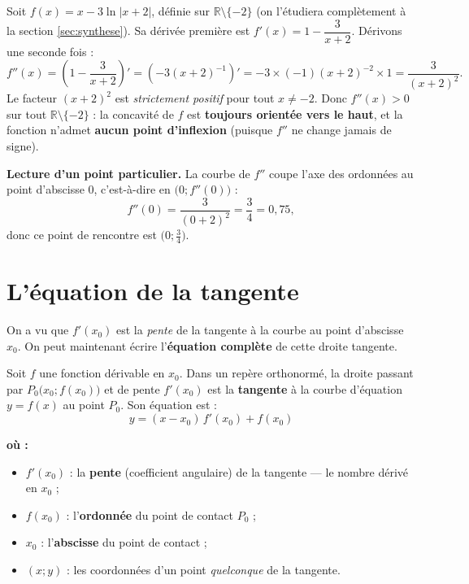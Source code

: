\documentclass[11pt,a4paper]{article}
\newenvironment{ou}{%
  \par\smallskip\noindent\textbf{où :}\nopagebreak
  \begin{itemize}[leftmargin=1.8em,topsep=2pt,itemsep=1.5pt,parsep=0pt]}%
  {\end{itemize}}
\newcommand{\R}{\mathbb{R}}
\begin{document}
\begin{exemple}
Soit $f(x)=x-3\ln|x+2|$, définie sur $\R\setminus\{-2\}$ (on l'étudiera complètement à la
section \ref{sec:synthese}). Sa dérivée première est $f'(x)=1-\dfrac{3}{x+2}$. Dérivons une seconde fois :
\[
   f''(x)=\left(1-\frac{3}{x+2}\right)'=\left(-3(x+2)^{-1}\right)'
         =-3\times(-1)(x+2)^{-2}\times 1=\frac{3}{(x+2)^2}.
\]
Le facteur $(x+2)^2$ est \emph{strictement positif} pour tout $x\neq -2$. Donc $f''(x)>0$ sur tout
$\R\setminus\{-2\}$ : la concavité de $f$ est \textbf{toujours orientée vers le haut}, et la fonction
n'admet \textbf{aucun point d'inflexion} (puisque $f''$ ne change jamais de signe).

\medskip
\textbf{Lecture d'un point particulier.} La courbe de $f''$ coupe l'axe des ordonnées au point
d'abscisse $0$, c'est-à-dire en $\big(0;f''(0)\big)$ :
\[
   f''(0)=\frac{3}{(0+2)^2}=\frac{3}{4}=0{,}75,
\]
donc ce point de rencontre est $\big(0;\tfrac34\big)$.
\end{exemple}

\section{L'équation de la tangente}
\label{sec:tangente}
On a vu que $f'(x_0)$ est la \emph{pente} de la tangente à la courbe au point d'abscisse $x_0$.
On peut maintenant écrire l'\textbf{équation complète} de cette droite tangente.

\begin{theoreme}
Soit $f$ une fonction dérivable en $x_0$. Dans un repère orthonormé, la droite passant par
$P_0\big(x_0;f(x_0)\big)$ et de pente $f'(x_0)$ est la \textbf{tangente} à la courbe d'équation
$y=f(x)$ au point $P_0$. Son équation est :
\[
   \boxed{\;y=(x-x_0)\,f'(x_0)+f(x_0)\;}
\]
\end{theoreme}

\begin{ou}
  \item $f'(x_0)$ : la \textbf{pente} (coefficient angulaire) de la tangente — le nombre dérivé en $x_0$ ;
  \item $f(x_0)$ : l'\textbf{ordonnée} du point de contact $P_0$ ;
  \item $x_0$ : l'\textbf{abscisse} du point de contact ;
  \item $(x;y)$ : les coordonnées d'un point \emph{quelconque} de la tangente.
\end{ou}
\end{document}
